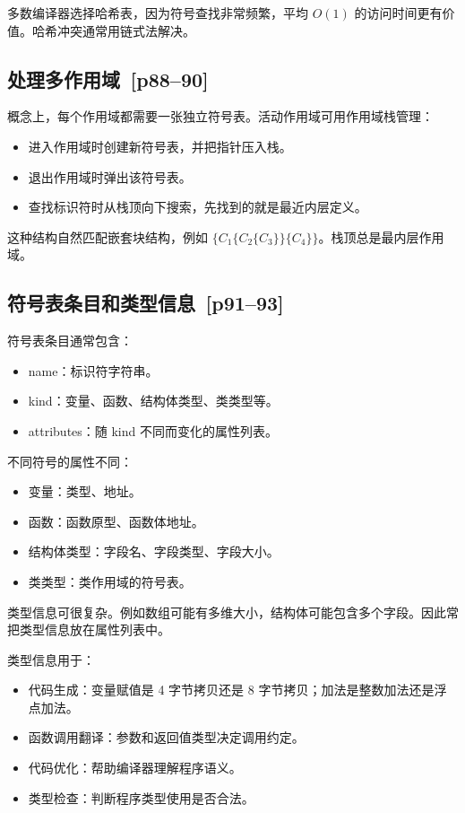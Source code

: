 \documentclass[UTF8,fontset=none,11pt]{ctexart}
\newcommand{\pg}[1]{\texorpdfstring{{\small\color{graytext}\,[p#1]}}{ [p#1]}}
\begin{document}
多数编译器选择哈希表，因为符号查找非常频繁，平均 \(O(1)\) 的访问时间更有价值。哈希冲突通常用链式法解决。

\subsection{处理多作用域 \pg{88--90}}

概念上，每个作用域都需要一张独立符号表。活动作用域可用作用域栈管理：

\begin{itemize}
  \item 进入作用域时创建新符号表，并把指针压入栈。
  \item 退出作用域时弹出该符号表。
  \item 查找标识符时从栈顶向下搜索，先找到的就是最近内层定义。
\end{itemize}

这种结构自然匹配嵌套块结构，例如 \(\{C_1\{C_2\{C_3\}\}\{C_4\}\}\)。栈顶总是最内层作用域。

\subsection{符号表条目和类型信息 \pg{91--93}}

符号表条目通常包含：

\begin{itemize}
  \item name：标识符字符串。
  \item kind：变量、函数、结构体类型、类类型等。
  \item attributes：随 kind 不同而变化的属性列表。
\end{itemize}

不同符号的属性不同：

\begin{itemize}
  \item 变量：类型、地址。
  \item 函数：函数原型、函数体地址。
  \item 结构体类型：字段名、字段类型、字段大小。
  \item 类类型：类作用域的符号表。
\end{itemize}

类型信息可很复杂。例如数组可能有多维大小，结构体可能包含多个字段。因此常把类型信息放在属性列表中。

类型信息用于：

\begin{itemize}
  \item 代码生成：变量赋值是 4 字节拷贝还是 8 字节拷贝；加法是整数加法还是浮点加法。
  \item 函数调用翻译：参数和返回值类型决定调用约定。
  \item 代码优化：帮助编译器理解程序语义。
  \item 类型检查：判断程序类型使用是否合法。
\end{itemize}
\end{document}

